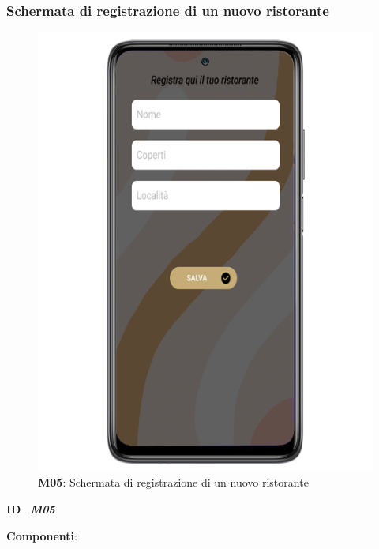         \subsubsection{Schermata di registrazione di un nuovo ristorante}
        \begin{figure}[H]
            \centering
            \includegraphics[scale=2]{assets/Mockup/Mockup_AddResturant.png}
            \caption{\textbf{M05}: Schermata di registrazione di un nuovo ristorante}
            \label{fig:Mockup_AddResturant}
        \end{figure}
        \begin{flushleft}
            \textbf{ID} \ \Large{\textit{\textbf{M05}}}
        \end{flushleft}
        \textbf{Componenti}:

